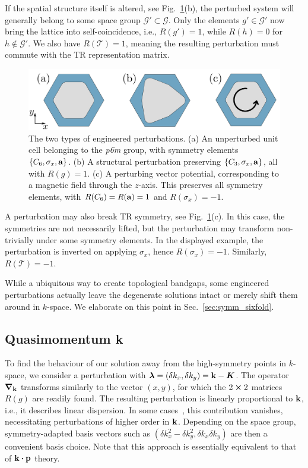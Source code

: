 If the spatial structure itself is altered, see Fig.~\ref{fig:symm_pert_types}(b), the perturbed system will generally belong to some space group $\mathcal{G'} \subset \mathcal{G}$. Only the elements $g' \in \mathcal{G'}$ now bring the lattice into self-coincidence, i.e., $R(g') = 1$, while $R(h) = 0$ for  $h \notin \mathcal{G'}$. We also have $R(\mathcal{T}) = 1$, meaning the resulting perturbation must commute with the TR representation matrix.
%
\begin{figure} [h!]
	\centering
	\includegraphics{figures/symmetries/pert_types.png}
	\caption{The two types of engineered perturbations. (a) An unperturbed unit cell belonging to the \textit{p6m} group, with symmetry elements $\{ C_6, \sigma_x, \vb{a}\}$. (b) A structural perturbation preserving $\{ C_3, \sigma_x, \vb{a}\}$, all with $R(g) = 1$. (c) A perturbing vector potential, corresponding to a magnetic field through the $z$-axis. This preserves all symmetry elements, with $R(C_6) = R(\vb{a}) = 1$ and $R(\sigma_x) = -1$.}
	\label{fig:symm_pert_types}
\end{figure}

A perturbation may also break TR symmetry, see Fig.~\ref{fig:symm_pert_types}(c). In this case, the symmetries are not necessarily lifted, but the perturbation may transform non-trivially under some symmetry elements. In the displayed example, the perturbation is inverted on applying $\sigma_x$, hence $R(\sigma_x) = -1$. Similarly, $R(\mathcal{T}) = -1$. 

While a ubiquitous way to create topological bandgaps, some engineered perturbations actually leave the degenerate solutions intact or merely shift them around in $k$-space. We elaborate on this point in Sec.~\ref{sec:symm_sixfold}. 

\subsection{Quasimomentum k} \label{sec:symm_kpert}

To find the behaviour of our solution away from the high-symmetry points in $k$-space, we consider a perturbation with $\boldsymbol{\lambda} = (\delta k_x, \delta k_y) = \vb{k} - \boldsymbol{K}$. The operator $\boldsymbol{\nabla}_{\vb{k}}$ transforms similarly to the vector $(x, y)$, for which the $2 \cross 2$ matrices $R(g)$ are readily found. The resulting perturbation is linearly proportional to $\vb{k}$, i.e., it describes linear dispersion. In some cases~\cite{Denner_2020}, this contribution vanishes, necessitating perturbations of higher order in $ \vb{k}$. Depending on the space group, symmetry-adapted basis vectors such as $(\delta k_x^2- \delta k_y^2, \delta k_x \delta k_y)$ are then a convenient basis choice. Note that this approach is essentially equivalent to that of $\vb{k} \vdot \vb{p}$ theory.

